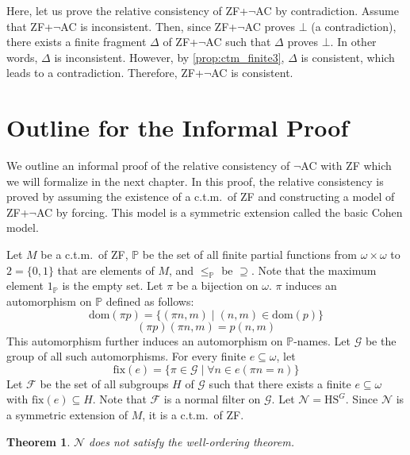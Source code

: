 \documentclass{report}
\newtheorem{thm}{Theorem}[section]
\begin{document}
Here, let us prove the relative consistency of ZF+$\neg$AC by contradiction.
Assume that ZF+$\neg$AC is inconsistent.  
Then, since ZF+$\neg$AC proves $\bot$ (a contradiction),  
there exists a finite fragment $\Delta$ of ZF+$\neg$AC such that $\Delta$ proves $\bot$.  
In other words, $\Delta$ is inconsistent.  
However, by \cref{prop:ctm_finite3}, $\Delta$ is consistent, which leads to a contradiction.
Therefore, ZF+$\neg$AC is consistent.


\section{Outline for the Informal Proof}\label{sec:outline}
We outline an informal proof of the relative consistency of $\neg$AC with ZF which we will formalize in the next chapter.
In this proof, the relative consistency is proved by assuming the existence of a c.t.m.\  of ZF and constructing a model of ZF+$\neg$AC by forcing. 
This model is a symmetric extension called the basic Cohen model.

Let $M$ be a c.t.m.\  of ZF, $\mathbb{P}$ be the set of all finite partial functions from $\omega \times \omega$ to $2 = \{0, 1\}$
that are elements of $M$, and $\leq_{\mathbb{P}}$ be $\supseteq$.
Note that the maximum element $1_{\mathbb{P}}$ is the empty set. 
Let $\pi$ be a bijection on $\omega$. $\pi$ induces an automorphism on $\mathbb{P}$ defined as follows:
$$\mathrm{dom}(\pi p) = \{ (\pi n, m) \mid (n, m) \in \mathrm{dom}(p) \}$$
$$(\pi p)(\pi n, m) = p(n, m)$$
This automorphism further induces an automorphism on $\mathbb{P}$-names. 
Let $\mathcal{G}$ be the group of all such automorphisms.
For every finite $e \subseteq \omega$, let 
$$\mathrm{fix}(e) = \{ \pi \in \mathcal{G} \mid \forall n \in e (\pi n = n) \}$$
Let $\mathcal{F}$ be the set of all subgroups $H$ of $\mathcal{G}$ such that there exists a finite $e \subseteq \omega$ with $\mathrm{fix}(e) \subseteq H$.
Note that $\mathcal{F}$ is a normal filter on $\mathcal{G}$. Let $\mathcal{N} = \mathrm{HS}^{G}$.
Since $\mathcal{N}$ is a symmetric extension of $M$, it is a c.t.m.\  of ZF. 

\begin{thm}
  $\mathcal{N}$ does not satisfy the well-ordering theorem.
\end{thm}
\end{document}
